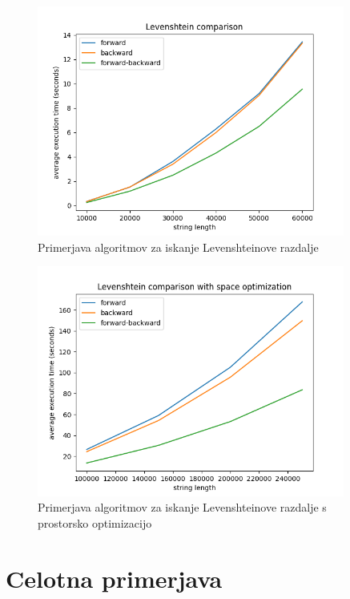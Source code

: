 \documentclass[a4paper,12pt,openright]{book}
\begin{document}
\begin{figure}[htb]
\begin{center}
\includegraphics[width=0.9\textwidth]{plots/Levenshtein_comparison.png}
\end{center}
\caption{Primerjava algoritmov za iskanje Levenshteinove razdalje}
\label{comparison3}
\end{figure}

\begin{figure}[htb]
\begin{center}
\includegraphics[width=0.9\textwidth]{plots/Levenshtein_comparison_space.png}
\end{center}
\caption{Primerjava algoritmov za iskanje Levenshteinove razdalje s prostorsko optimizacijo}
\label{comparison4}
\end{figure}

\section{Celotna primerjava}
\end{document}

